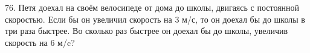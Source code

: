 76. Петя доехал на своём велосипеде от дома до школы, двигаясь с постоянной скоростью. Если бы он увеличил скорость на 3 м/с, то он доехал бы до школы в три раза быстрее. Во сколько раз быстрее он доехал бы до школы, увеличив скорость на 6 м/c?\\
